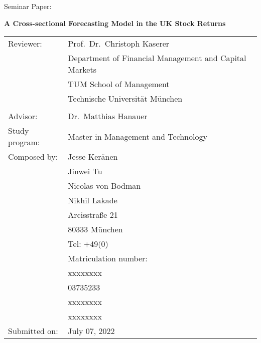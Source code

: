 \documentclass[a4paper,12pt]{article}
\begin{document}
\thispagestyle{empty}
\begin{center}
  Seminar Paper: \vspace{0.5cm} \\\vspace{1.5cm}

  {\Large{\bf A Cross-sectional Forecasting Model in the UK Stock Returns}} \\\vspace{2.5cm} 
\begin{table*}[!ht]
  \centering
    \begin{tabular}{ll}
      Reviewer: & Prof.~Dr.~Christoph Kaserer \\
                & Department of Financial Management and Capital Markets \\
                & TUM School of Management \\
                & Technische Universität München \\
                &  \vspace{0.5cm}\\
      
      Advisor: & Dr.~Matthias Hanauer \vspace{0.5cm}\\
      
      Study program: & Master in Management and Technology \vspace{0.5cm}\\
      
      Composed by: & Jesse Keränen \\
                   & Jinwei Tu \\
                   & Nicolas von Bodman \\
                   & Nikhil Lakade \vspace{0.2cm}\\
                   & Arcisstraße 21 \\
                   & 80333 München \vspace{0.2cm}\\
                   & Tel: +49(0) \vspace{0.2cm}\\
                   & Matriculation number: \\
                   & xxxxxxxx \\
                   & 03735233 \\
                   & xxxxxxxx \\
                   & xxxxxxxx \vspace{0.5cm}\\
                   \addlinespace
                   
      Submitted on: & July 07, 2022\\
    \end{tabular}
\end{table*}
\end{center}
\end{document}
